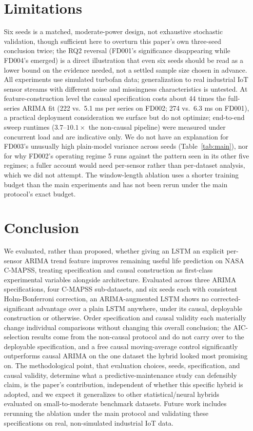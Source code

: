\documentclass[conference]{IEEEtran}
\begin{document}
\section{Limitations}
Six seeds is a matched, moderate-power design, not exhaustive stochastic validation, though sufficient here to overturn this paper's own three-seed conclusion twice; the RQ2 reversal (FD001's significance disappearing while FD004's emerged) is a direct illustration that even six seeds should be read as a lower bound on the evidence needed, not a settled sample size chosen in advance. All experiments use simulated turbofan data; generalization to real industrial IoT sensor streams with different noise and missingness characteristics is untested. At feature-construction level the causal specification costs about 44 times the full-series ARIMA fit (222 vs.\ 5.1 ms per series on FD002; 274 vs.\ 6.3 ms on FD001), a practical deployment consideration we surface but do not optimize; end-to-end sweep runtimes ($3.7$--$10.1\times$ the non-causal pipeline) were measured under concurrent load and are indicative only. We do not have an explanation for FD003's unusually high plain-model variance across seeds (Table~\ref{tab:main}), nor for why FD002's operating regime 5 runs against the pattern seen in its other five regimes; a fuller account would need per-sensor rather than per-dataset analysis, which we did not attempt. The window-length ablation uses a shorter training budget than the main experiments and has not been rerun under the main protocol's exact budget.

\section{Conclusion}
We evaluated, rather than proposed, whether giving an LSTM an explicit per-sensor ARIMA trend feature improves remaining useful life prediction on NASA C-MAPSS, treating specification and causal construction as first-class experimental variables alongside architecture. Evaluated across three ARIMA specifications, four C-MAPSS sub-datasets, and six seeds each with consistent Holm-Bonferroni correction, an ARIMA-augmented LSTM shows no corrected-significant advantage over a plain LSTM anywhere, under its causal, deployable construction or otherwise. Order specification and causal validity each materially change individual comparisons without changing this overall conclusion; the AIC-selection results come from the non-causal protocol and do not carry over to the deployable specification, and a free causal moving-average control significantly outperforms causal ARIMA on the one dataset the hybrid looked most promising on. The methodological point, that evaluation choices, seeds, specification, and causal validity, determine what a predictive-maintenance study can defensibly claim, is the paper's contribution, independent of whether this specific hybrid is adopted, and we expect it generalizes to other statistical/neural hybrids evaluated on small-to-moderate benchmark datasets. Future work includes rerunning the ablation under the main protocol and validating these specifications on real, non-simulated industrial IoT data.
\end{document}
